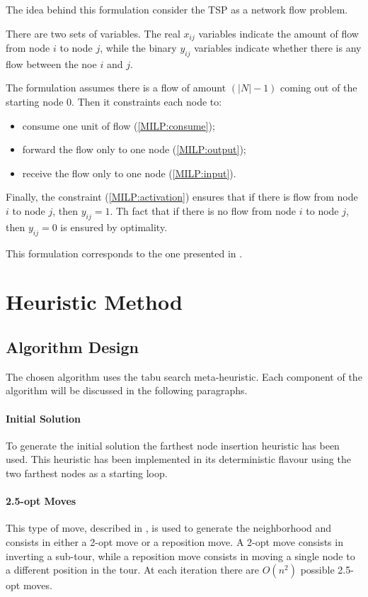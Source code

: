 \documentclass{article}
\begin{document}
The idea behind this formulation consider the TSP as a network flow problem.

There are two sets of variables.
The real $x_{i j}$ variables indicate the amount of flow from node $i$ to node $j$, while the binary $y_{i j}$ variables indicate whether there is any flow between the noe $i$ and $j$.

The formulation assumes there is a flow of amount $(|N|-1)$ coming out of the starting node $0$.
Then it constraints each node to:
\begin{itemize}
    \item consume one unit of flow (\ref{MILP:consume});
    \item forward the flow only to one node (\ref{MILP:output});
    \item receive the flow only to one node (\ref{MILP:input}).
\end{itemize}

Finally, the constraint (\ref{MILP:activation}) ensures that if there is flow from node $i$ to node $j$, then $y_{i j} = 1$.
Th fact that if there is no flow from node $i$ to node $j$, then $y_{i j} = 0$ is ensured by optimality.

This formulation corresponds to the one presented in \cite{gavish1978travelling}.

\section{Heuristic Method}

\subsection{Algorithm Design}
The chosen algorithm uses the tabu search meta-heuristic.
Each component of the algorithm will be discussed in the following paragraphs.

\paragraph{Initial Solution}
To generate the initial solution the farthest node insertion heuristic has been used.
This heuristic has been implemented in its deterministic flavour using the two farthest nodes as a starting loop.

\paragraph{2.5-opt Moves}
This type of move, described in \cite{johnson1997traveling}, is used to generate the neighborhood and consists in either a 2-opt move or a reposition move.
A 2-opt move consists in inverting a sub-tour, while a reposition move consists in moving a single node to a different position in the tour.
At each iteration there are $O(n^2)$ possible 2.5-opt moves.
\end{document}
